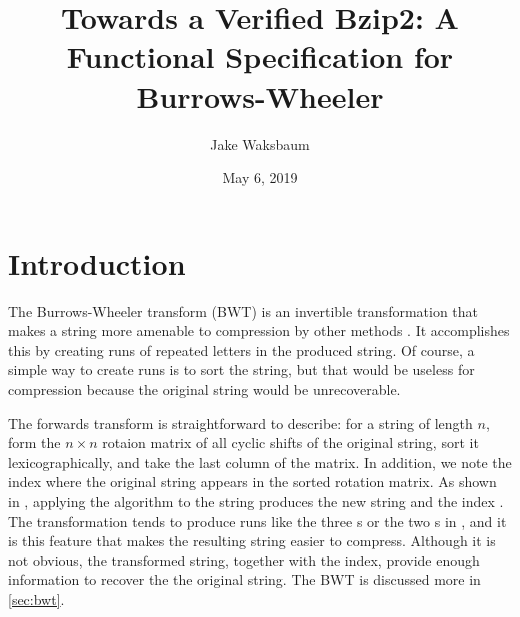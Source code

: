 \documentclass[11pt]{thesis}
\title{Towards a Verified Bzip2: A Functional Specification for Burrows-Wheeler}
\author{Jake Waksbaum}
\date{May 6, 2019}
\begin{document}
\maketitle
\vfill

\section{Introduction}
\label{sec:intro}

The Burrows-Wheeler transform (BWT) is an invertible transformation
that makes a string more amenable to compression by other methods
\cite{bw}. It accomplishes this by creating runs of repeated letters
in the produced string. Of course, a simple way to create runs is to
sort the string, but that would be useless for compression because the
original string would be unrecoverable.

The forwards transform is straightforward to describe: for
a string of length \(n\), form the \(n \times n\) rotaion matrix of all
cyclic shifts of the original string, sort it lexicographically, and
take the last column of the matrix. In addition, we note the index
where the original string appears in the sorted rotation matrix. As
shown in , applying the algorithm to the string
 produces the new string  and
the index . The transformation tends to produce runs like
the three s or the two s in ,
and it is this feature that makes the resulting string easier to
compress. Although it is not obvious, the transformed string, together
with the index, provide enough information to recover the the original
string. The BWT is discussed more in \cref{sec:bwt}.
\end{document}
